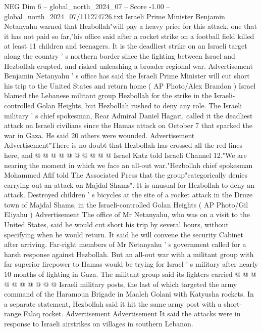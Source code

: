 \begin{textsample}{NEG Dim 6 – global\_north\_2024\_07 – Score -1.00 – global\_north\_2024\_07/111274726.txt}  \label{ex:f6_neg_218}
Israeli Prime Minister Benjamin Netanyahu warned that Hezbollah"will pay a heavy price for this attack, one that it has not paid so far,"his office said after a rocket strike on a football field killed at least 11 children and teenagers.
It is the deadliest strike on an Israeli target along the country ' s northern border since the fighting between Israel and Hezbollah erupted, and risked unleashing a broader regional war.
Advertisement Benjamin Netanyahu ' s office has said the Israeli Prime Minister will cut short his trip to the United States and return home ( AP Photo/Alex Brandon ) Israel blamed the Lebanese militant group Hezbollah for the strike in the Israeli-controlled Golan Heights, but Hezbollah rushed to deny any role.
The Israeli military ' s chief spokesman, Rear Admiral Daniel Hagari, called it the deadliest attack on Israeli civilians since the Hamas attack on October 7 that sparked the war in Gaza.
He said 20 others were wounded.
Advertisement Advertisement"There is no doubt that Hezbollah has crossed all the red lines here, and @ @ @ @ @ @ @ @ @ @ Israel Katz told Israeli Channel 12."We are nearing the moment in which we face an all-out war."Hezbollah chief spokesman Mohammed Afif told The Associated Press that the group"categorically denies carrying out an attack on Majdal Shams".
It is unusual for Hezbollah to deny an attack.
Destroyed children ' s bicycles at the site of a rocket attack in the Druze town of Majdal Shams, in the Israeli-controlled Golan Heights ( AP Photo/Gil Eliyahu ) Advertisement The office of Mr Netanyahu, who was on a visit to the United States, said he would cut short his trip by several hours, without specifying when he would return.
It said he will convene the security Cabinet after arriving.
Far-right members of Mr Netanyahu ' s government called for a harsh response against Hezbollah.
But an all-out war with a militant group with far superior firepower to Hamas would be trying for Israel ' s military after nearly 10 months of fighting in Gaza.
The militant group said its fighters carried @ @ @ @ @ @ @ @ @ @ Israeli military posts, the last of which targeted the army command of the Haramoun Brigade in Maaleh Golani with Katyusha rockets.
In a separate statement, Hezbollah said it hit the same army post with a short-range Falaq rocket.
Advertisement Advertisement It said the attacks were in response to Israeli airstrikes on villages in southern Lebanon.

\end{textsample}
